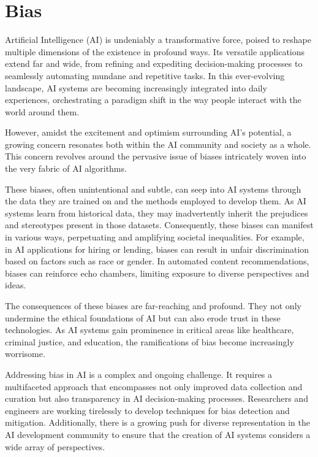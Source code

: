\documentclass[12pt,a4paper,openright,twoside]{book}
\begin{document}
\newpage
\section{Bias}

Artificial Intelligence (AI) is undeniably a transformative force, poised to reshape multiple dimensions of the existence in profound ways. Its versatile applications extend far and wide, from refining and expediting decision-making processes to seamlessly automating mundane and repetitive tasks. In this ever-evolving landscape, AI systems are becoming increasingly integrated into daily experiences, orchestrating a paradigm shift in the way people interact with the world around them. 

However, amidst the excitement and optimism surrounding AI's potential, a growing concern resonates both within the AI community and society as a whole. This concern revolves around the pervasive issue of biases intricately woven into the very fabric of AI algorithms. 

These biases, often unintentional and subtle, can seep into AI systems through the data they are trained on and the methods employed to develop them. As AI systems learn from historical data, they may inadvertently inherit the prejudices and stereotypes present in those datasets. Consequently, these biases can manifest in various ways, perpetuating and amplifying societal inequalities. For example, in AI applications for hiring or lending, biases can result in unfair discrimination based on factors such as race or gender. In automated content recommendations, biases can reinforce echo chambers, limiting exposure to diverse perspectives and ideas. 

The consequences of these biases are far-reaching and profound. They not only undermine the ethical foundations of AI but can also erode trust in these technologies. As AI systems gain prominence in critical areas like healthcare, criminal justice, and education, the ramifications of bias become increasingly worrisome. 

Addressing bias in AI is a complex and ongoing challenge. It requires a multifaceted approach that encompasses not only improved data collection and curation but also transparency in AI decision-making processes. Researchers and engineers are working tirelessly to develop techniques for bias detection and mitigation. Additionally, there is a growing push for diverse representation in the AI development community to ensure that the creation of AI systems considers a wide array of perspectives. 
\end{document}
